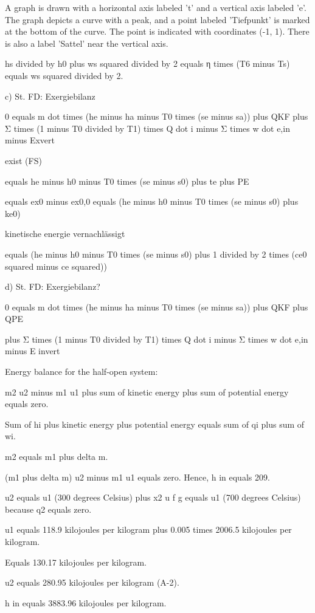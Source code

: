 A graph is drawn with a horizontal axis labeled 't' and a vertical axis labeled 'e'. The graph depicts a curve with a peak, and a point labeled 'Tiefpunkt' is marked at the bottom of the curve. The point is indicated with coordinates (-1, 1). There is also a label 'Sattel' near the vertical axis.

hs divided by h0 plus ws squared divided by 2 equals η times (T6 minus Ts) equals ws squared divided by 2.

c) St. FD: Exergiebilanz

0 equals m dot times (he minus ha minus T0 times (se minus sa)) plus QKF plus Σ times (1 minus T0 divided by T1) times Q dot i minus Σ times w dot e,in minus Exvert

exist (FS)

equals he minus h0 minus T0 times (se minus s0) plus te plus PE

equals ex0 minus ex0,0 equals (he minus h0 minus T0 times (se minus s0) plus ke0)

kinetische energie vernachlässigt

equals (he minus h0 minus T0 times (se minus s0) plus 1 divided by 2 times (ce0 squared minus ce squared))

d) St. FD: Exergiebilanz?

0 equals m dot times (he minus ha minus T0 times (se minus sa)) plus QKF plus QPE

plus Σ times (1 minus T0 divided by T1) times Q dot i minus Σ times w dot e,in minus E invert

Energy balance for the half-open system:

m2 u2 minus m1 u1 plus sum of kinetic energy plus sum of potential energy equals zero.

Sum of hi plus kinetic energy plus potential energy equals sum of qi plus sum of wi.

m2 equals m1 plus delta m.

(m1 plus delta m) u2 minus m1 u1 equals zero. Hence, h in equals 209.

u2 equals u1 (300 degrees Celsius) plus x2 u f g equals u1 (700 degrees Celsius) because q2 equals zero.

u1 equals 118.9 kilojoules per kilogram plus 0.005 times 2006.5 kilojoules per kilogram.

Equals 130.17 kilojoules per kilogram.

u2 equals 280.95 kilojoules per kilogram (A-2).

h in equals 3883.96 kilojoules per kilogram.

